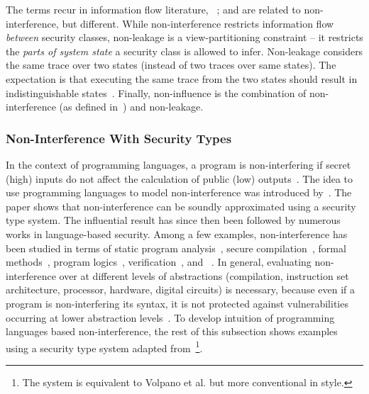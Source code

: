 The terms recur in information flow literature, \eg~\cite{nelson2020,ileri2024};
and are related to {non-interference}, but different.
While non-interference restricts information flow \emph{between} security classes,
{{non-leakage}} is a view-partitioning constraint --
it restricts the \emph{parts of system state} a security class is allowed to infer.
Non-leakage considers the same trace over two states (instead of two traces over same states).
The expectation is that executing the same trace from the two states should result in indistinguishable states~\cite{nelson2020}.
Finally, {{non-influence}} is the combination of non-interference (as defined in~\cite{rushby1992}) and non-leakage.

\subsubsection{Non-Interference With Security Types}
\label{sec-types}

In the context of programming languages, a program is {non-interfering} if 
{secret (high) inputs} do not affect the calculation of {public (low) outputs}~\cite{sabelfeld2003}.
The idea to use programming languages to model {non-interference} was introduced by~\textcite{volpano1996}.
The paper shows that {non-interference} can be soundly approximated using a {security type system}.
The influential result has since then been followed by numerous works in language-based security.
Among a few examples, {non-interference} has been studied in terms of
static program analysis~\cite{barthe2007,huang2014},
{secure compilation}~\cite{patrignani2017,myers1999,cecchetti2017},
formal methods~\cite{kammuller2008,nelson2020},
program logics~\cite{frumin2021,karbyshev2018,garg2006,beringer2007},
verification~\cite{eilers2023},
and ~\cite{hritcu2013}.
In general, evaluating {non-interference} over at different levels of abstractions
(compilation, instruction set architecture, processor, hardware, digital circuits) is necessary,
because even if a program is {non-interfering} \wrt its syntax,
it is not protected against vulnerabilities occurring at lower abstraction levels~\cite{piessens2024}.
To develop intuition of programming languages based {non-interference},
the rest of this subsection shows examples using {a security type system} adapted from~\cite{sabelfeld2003}\footnote{
The system is equivalent to Volpano et al. but more conventional in style.}.

